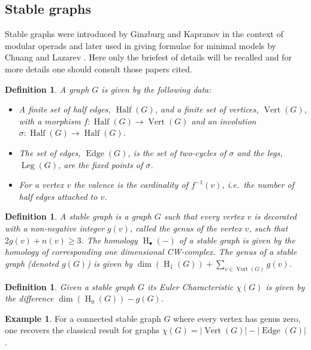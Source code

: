 \documentclass[]{amsart}
\newtheorem{definition}[theorem]{Definition}
\theoremstyle{definition}
\newtheorem{example}[theorem]{Example}
\newcommand{\homology}{\operatorname{H}}
\begin{document}
\subsection{Stable graphs}

Stable graphs were introduced by Ginzburg and Kapranov \cite{ginzburg_kapranov} in the context of modular operads and later used in giving formulae for minimal models by Chuang and Lazarev \cite{chuang_lazarev_dual_feynman,chuang_laz_feynman}. Here only the briefest of details will be recalled and for more details one should consult those papers cited.

\begin{definition}
A graph $G$ is given by the following data:
\begin{itemize}
\item A finite set of half edges, $\operatorname{Half}(G)$, and a finite set of vertices, $\operatorname{Vert}(G)$, with a morphism $f\colon\operatorname{Half}(G)\to \operatorname{Vert}(G)$ and an involution $\sigma\colon \operatorname{Half}(G)\to\operatorname{Half}(G)$.  
\item The set of edges, $\operatorname{Edge}(G)$, is the set of two-cycles of $\sigma$ and the legs, $\operatorname{Leg}(G)$, are the fixed points of $\sigma$.
\item For a vertex $v$ the valence is the cardinality of $f^{-1}(v)$, i.e.\ the number of half edges attached to $v$.
\end{itemize}
\end{definition}

\begin{definition}
A stable graph is a graph $G$ such that every vertex $v$ is decorated with a non-negative integer $g(v)$, called the genus of the vertex $v$, such that $2 g(v) + n(v) \geq 3$. The homology $\operatorname{H}_\bullet (-)$ of a stable graph is given by the homology of corresponding one dimensional CW-complex. The genus of a stable graph (denoted $g(G)$) is given by $\dim( \homology_1 (G) ) + \sum_{v\in \operatorname{Vert} (G)} g(v)$.
\end{definition}

\begin{definition}
Given a stable graph $G$ its Euler Characteristic $\chi (G)$ is given by the difference $\dim( \homology_0 (G) ) - g(G)$.
\end{definition}

\begin{example}
For a connected stable graph $G$ where every vertex has genus zero, one recovers the classical result for graphs $\chi (G)= |\operatorname{Vert}(G)|-|\operatorname{Edge}(G)|$. 
\end{example}
\end{document}
